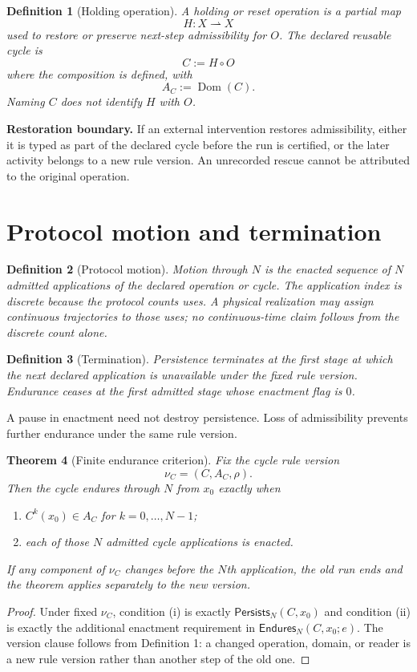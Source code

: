 \documentclass[11pt]{article}
\newtheorem{theorem}{Theorem}[section]
\newtheorem{definition}[theorem]{Definition}
\newcommand{\Persists}{\mathsf{Persists}}
\newcommand{\Endures}{\mathsf{Endures}}
\begin{document}
\begin{definition}[Holding operation]
A holding or reset operation is a partial map
\[
H:X\rightharpoonup X
\]
used to restore or preserve next-step admissibility for $O$. The declared reusable cycle is
\[
C:=H\circ O
\]
where the composition is defined, with
\[
A_C:=\operatorname{Dom}(C).
\]
Naming $C$ does not identify $H$ with $O$.
\end{definition}

\textbf{Restoration boundary.} If an external intervention restores admissibility, either it is typed as part of the declared cycle before the run is certified, or the later activity belongs to a new rule version. An unrecorded rescue cannot be attributed to the original operation.

\section{Protocol motion and termination}
\begin{definition}[Protocol motion]
Motion through $N$ is the enacted sequence of $N$ admitted applications of the declared operation or cycle. The application index is discrete because the protocol counts uses. A physical realization may assign continuous trajectories to those uses; no continuous-time claim follows from the discrete count alone.
\end{definition}

\begin{definition}[Termination]
Persistence terminates at the first stage at which the next declared application is unavailable under the fixed rule version. Endurance ceases at the first admitted stage whose enactment flag is $0$.
\end{definition}
A pause in enactment need not destroy persistence. Loss of admissibility prevents further endurance under the same rule version.

\begin{theorem}[Finite endurance criterion]
Fix the cycle rule version
\[
\nu_C=(C,A_C,\rho).
\]
Then the cycle endures through $N$ from $x_0$ exactly when
\begin{enumerate}[label=(\roman*)]
\item $C^k(x_0)\in A_C$ for $k=0,\ldots,N-1$;
\item each of those $N$ admitted cycle applications is enacted.
\end{enumerate}
If any component of $\nu_C$ changes before the $N$th application, the old run ends and the theorem applies separately to the new version.
\end{theorem}
\begin{proof}
Under fixed $\nu_C$, condition (i) is exactly $\Persists_N(C,x_0)$ and condition (ii) is exactly the additional enactment requirement in $\Endures_N(C,x_0;e)$. The version clause follows from Definition 1: a changed operation, domain, or reader is a new rule version rather than another step of the old one.
\end{proof}
\end{document}
